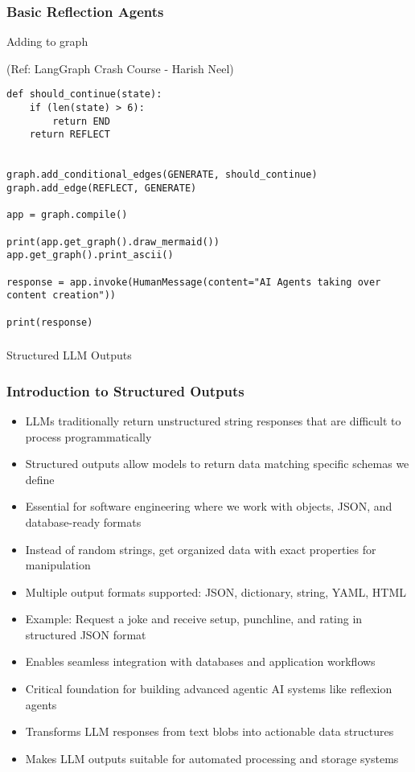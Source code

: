 \begin{frame}[fragile]\frametitle{Basic Reflection Agents}

Adding to graph

{\tiny (Ref: LangGraph Crash Course - Harish Neel)}

\begin{lstlisting}[basicstyle=\scriptsize\ttfamily]
def should_continue(state):
    if (len(state) > 6):
        return END 
    return REFLECT


graph.add_conditional_edges(GENERATE, should_continue)
graph.add_edge(REFLECT, GENERATE)

app = graph.compile()

print(app.get_graph().draw_mermaid())
app.get_graph().print_ascii()

response = app.invoke(HumanMessage(content="AI Agents taking over content creation"))

print(response)

  \end{lstlisting}
  
  

\end{frame}

\begin{frame}[fragile]\frametitle{}
\begin{center}
{\Large Structured LLM Outputs}
\end{center}
\end{frame}

\begin{frame}[fragile]\frametitle{Introduction to Structured Outputs}
      \begin{itemize}
	\item LLMs traditionally return unstructured string responses that are difficult to process programmatically
	\item Structured outputs allow models to return data matching specific schemas we define
	\item Essential for software engineering where we work with objects, JSON, and database-ready formats
	\item Instead of random strings, get organized data with exact properties for manipulation
	\item Multiple output formats supported: JSON, dictionary, string, YAML, HTML
	\item Example: Request a joke and receive setup, punchline, and rating in structured JSON format
	\item Enables seamless integration with databases and application workflows
	\item Critical foundation for building advanced agentic AI systems like reflexion agents
	\item Transforms LLM responses from text blobs into actionable data structures
	\item Makes LLM outputs suitable for automated processing and storage systems
	  \end{itemize}
\end{frame}

